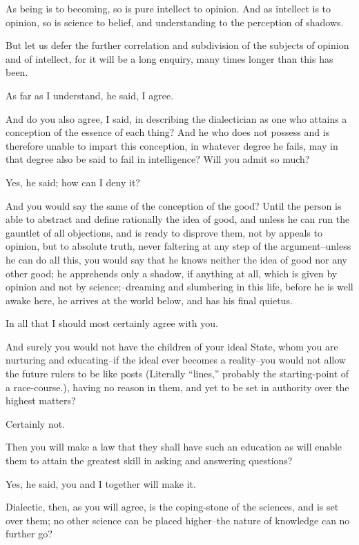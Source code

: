 As being is to becoming, so is pure intellect to opinion. And as
intellect is to opinion, so is science to belief, and understanding to
the perception of shadows.

But let us defer the further correlation and subdivision of the subjects
of opinion and of intellect, for it will be a long enquiry, many times
longer than this has been.

As far as I understand, he said, I agree.

And do you also agree, I said, in describing the dialectician as one who
attains a conception of the essence of each thing? And he who does not
possess and is therefore unable to impart this conception, in
whatever degree he fails, may in that degree also be said to fail in
intelligence? Will you admit so much?

Yes, he said; how can I deny it?

And you would say the same of the conception of the good? Until the
person is able to abstract and define rationally the idea of good,
and unless he can run the gauntlet of all objections, and is ready to
disprove them, not by appeals to opinion, but to absolute truth, never
faltering at any step of the argument--unless he can do all this, you
would say that he knows neither the idea of good nor any other good; he
apprehends only a shadow, if anything at all, which is given by opinion
and not by science;--dreaming and slumbering in this life, before he
is well awake here, he arrives at the world below, and has his final
quietus.

In all that I should most certainly agree with you.

And surely you would not have the children of your ideal State, whom you
are nurturing and educating--if the ideal ever becomes a reality--you
would not allow the future rulers to be like posts (Literally ``lines,''
probably the starting-point of a race-course.), having no reason in
them, and yet to be set in authority over the highest matters?

Certainly not.

Then you will make a law that they shall have such an education as
will enable them to attain the greatest skill in asking and answering
questions?

Yes, he said, you and I together will make it.

Dialectic, then, as you will agree, is the coping-stone of the sciences,
and is set over them; no other science can be placed higher--the nature
of knowledge can no further go?

